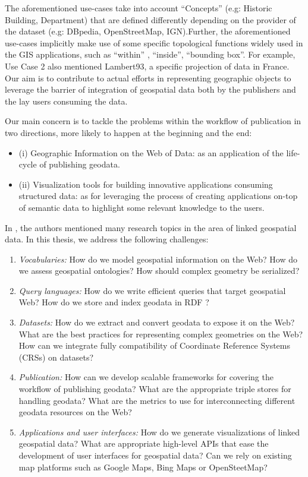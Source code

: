 \begin{enumerate}
\begin{verbatim}
\end{verbatim} 

 The aforementioned use-cases take into account ``Concepts'' (e.g: Historic Building, Department) that are defined differently depending on the provider of the dataset (e.g: DBpedia, OpenStreetMap, IGN).Further, the aforementioned use-cases implicitly make use of some specific topological functions widely used in the GIS applications, such as ``within'' , ``inside'', ``bounding box''. For example, Use Case 2 also mentioned Lambert93, a specific projection of data in France. Our aim is to contribute to actual efforts in representing geographic objects to leverage the barrier of integration of geospatial data both by the publishers and the lay users consuming the data. 

Our main concern is to tackle the problems within the workflow of publication in two directions, more likely to happen at the beginning and the end: 
\begin{itemize}
\item (i) Geographic Information on the Web of Data: as an application of the life-cycle of publishing geodata.
\item (ii) Visualization tools for building innovative applications consuming structured data: as for leveraging the process of creating applications on-top of semantic data to highlight some relevant knowledge to the users.

\end{itemize}

In \cite{koubarakis12}, the authors mentioned many research topics in the area of linked geospatial data. In this thesis, we address the following challenges:

\begin{enumerate}

\item \textit{Vocabularies:} How do we model geospatial information on the Web? How do we assess geospatial ontologies? How should complex geometry be serialized? 
\item \textit{Query languages:} How do we write efficient queries that target geospatial Web? How do we store and index geodata in RDF ?
\item \textit{Datasets:} How do we extract and convert geodata to expose it on the Web? What are the best practices for representing complex geometries on the Web? How can we integrate fully compatibility of Coordinate Reference Systems (CRSs) on datasets? 
\item \textit{Publication:} How can we develop scalable frameworks for covering the workflow of publishing geodata? What are the appropriate triple stores for handling geodata? What are the metrics to use for interconnecting different geodata resources on the Web?  
\item \textit{Applications and user interfaces:} How do we generate visualizations of linked geospatial data? What are appropriate high-level APIs that ease the development of user interfaces for geospatial data? Can we rely on existing map platforms such as Google Maps, Bing Maps or OpenSteetMap?
\end{enumerate}


\end{enumerate}
